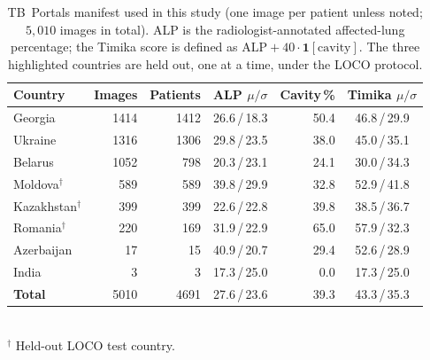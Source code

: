 \begin{table}[!htb]
\centering
\caption{TB~Portals manifest used in this study (one image per patient unless noted; $5{,}010$ images in total). ALP is the radiologist-annotated affected-lung percentage; the Timika score is defined as $\mathrm{ALP}+40\!\cdot\!\mathbf{1}[\mathrm{cavity}]$. The three highlighted countries are held out, one at a time, under the LOCO protocol.}
\label{tab:cohort}
\small
\setlength{\tabcolsep}{6pt}
\begin{tabular}{lrrcrc}
\toprule
Country & Images & Patients & ALP $\mu/\sigma$ & Cavity\,\% & Timika $\mu/\sigma$ \\
\midrule
Georgia              & 1414 & 1412 & 26.6\,/\,18.3 & 50.4 & 46.8\,/\,29.9 \\
Ukraine              & 1316 & 1306 & 29.8\,/\,23.5 & 38.0 & 45.0\,/\,35.1 \\
Belarus              & 1052 & \phantom{0}798 & 20.3\,/\,23.1 & 24.1 & 30.0\,/\,34.3 \\
Moldova$^{\dagger}$  & \phantom{0}589 & \phantom{0}589 & 39.8\,/\,29.9 & 32.8 & 52.9\,/\,41.8 \\
Kazakhstan$^{\dagger}$ & \phantom{0}399 & \phantom{0}399 & 22.6\,/\,22.8 & 39.8 & 38.5\,/\,36.7 \\
Romania$^{\dagger}$  & \phantom{0}220 & \phantom{0}169 & 31.9\,/\,22.9 & 65.0 & 57.9\,/\,32.3 \\
Azerbaijan           & \phantom{00}17 & \phantom{00}15 & 40.9\,/\,20.7 & 29.4 & 52.6\,/\,28.9 \\
India                & \phantom{000}3 & \phantom{000}3 & 17.3\,/\,25.0 & \phantom{0}0.0 & 17.3\,/\,25.0 \\
\midrule
\textbf{Total}       & 5010 & 4691 & 27.6\,/\,23.6 & 39.3 & 43.3\,/\,35.3 \\
\bottomrule
\end{tabular}
\\[2pt]{\footnotesize $^{\dagger}$ Held-out LOCO test country.}
\end{table}
